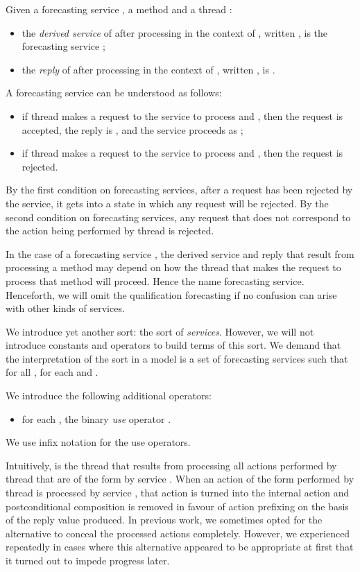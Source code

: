 \documentclass[fleqn]{llncs}
\begin{document}
Given a forecasting service , a method
 and a thread :
\begin{itemize}
\item
the \emph{derived service} of  after processing  in the context
of , written , is the forecasting service
;
\item
the \emph{reply} of  after processing  in the context of ,
written , is .
\end{itemize}

A forecasting service  can be understood as
follows:
\begin{itemize}
\item
if thread  makes a request to the service to process  and
, then the request is accepted, the reply is
, and the service proceeds as ;
\item
if thread  makes a request to the service to process  and
, then the request is rejected.
\end{itemize}
By the first condition on forecasting services, after a request has been
rejected by the service, it gets into a state in which any request will
be rejected.
By the second condition on forecasting services, any request that does
not correspond to the action being performed by thread  is rejected.

In the case of a forecasting service ,
the derived service and reply that result from processing a method may
depend on how the thread that makes the request to process that method
will proceed.
Hence the name forecasting service.
Henceforth, we will omit the qualification forecasting if no confusion
can arise with other kinds of services.

We introduce yet another sort: the sort  of \emph{services}.
However, we will not introduce constants and operators to build terms of
this sort.
We demand that the interpretation of the sort  in a model is a
set  of forecasting services such that for all ,
 for each  and .

We introduce the following additional operators:
\begin{itemize}
\item
for each , the binary \emph{use} operator
.
\end{itemize}
We use infix notation for the use operators.

Intuitively,  is the thread that results from processing
all actions performed by thread  that are of the form  by
service .
When an action of the form  performed by thread  is processed by
service , that action is turned into the internal action  and
postconditional composition is removed in favour of action prefixing on
the basis of the reply value produced.
In previous work, we sometimes opted for the alternative to conceal the
processed actions completely.
However, we experienced repeatedly in cases where this alternative
appeared to be appropriate at first that it turned out to impede
progress later.
\end{document}
